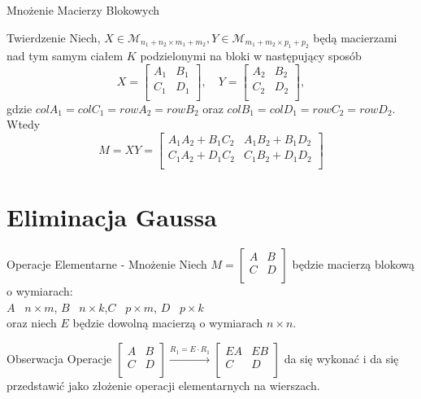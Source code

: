 \documentclass{beamer}
\begin{document}
\begin{frame}{Mnożenie Macierzy Blokowych}
    \begin{block}{Twierdzenie}
        Niech, $X \in \mathcal{M}_{n_1 + n_2 \times m_1 + m_2},Y \in \mathcal{M}_{m_1 + m_2 \times p_1 + p_2}$ będą macierzami nad tym samym ciałem $K$ podzielonymi na bloki w następujący sposób
        $$X =\begin{bmatrix}
            A_1 & B_1 \\ C_1 & D_1 \\
        \end{bmatrix}, \quad Y = \begin{bmatrix}
            A_2 & B_2 \\ C_2 & D_2 \\ 
        \end{bmatrix},$$  gdzie $col A_1 = col C_1 = row A_2 = row B_2$ oraz $col B_1 = col D_1 = row C_2 = row D_2 .$
        \newline 
        Wtedy 
        $$ M = XY = \begin{bmatrix}
            A_1 A_2 +  B_1 C_2 & A_1 B_2 + B_1 D_2 \\
            C_1 A_2 + D_1 C_2 & C_1 B_2 + D_1 D_2 \\
        \end{bmatrix}$$
    \end{block}
\end{frame}

\section{Eliminacja Gaussa}

\begin{frame}{Operacje Elementarne - Mnożenie}
    Niech $M = \begin{bmatrix}
        A & B \\ C & D \\ 
    \end{bmatrix}$ będzie macierzą blokową o wymiarach: \\
    $A$ \textendash \ $n \times m$, \quad$B$ \textendash \ $n \times k$,\quad $C$ \textendash \ $p \times m$, \quad $D$ \textendash \ $p \times k$ \\
    oraz niech $E$ będzie dowolną macierzą o wymiarach $n \times n$. 
    \begin{alertblock}{Obserwacja}
        Operacje $\begin{bmatrix}
            A & B \\ C & D \\
        \end{bmatrix} \xrightarrow{R_1 = E \cdot R_1} \begin{bmatrix}
            E  A & E  B \\ C & D \\ 
        \end{bmatrix}$ da się wykonać i da się przedstawić jako złożenie operacji elementarnych na wierszach.
    \end{alertblock}
\end{frame}
\end{document}
